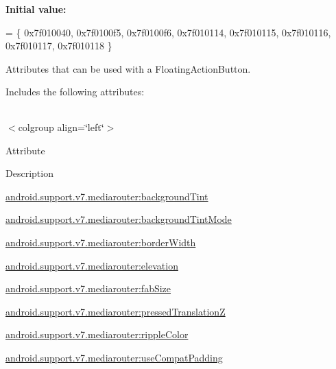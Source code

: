 {\bfseries Initial value\+:}
\begin{DoxyCode}
= \{
            0x7f010040, 0x7f0100f5, 0x7f0100f6, 0x7f010114,
            0x7f010115, 0x7f010116, 0x7f010117, 0x7f010118
        \}
\end{DoxyCode}
Attributes that can be used with a Floating\+Action\+Button. 

Includes the following attributes\+:

\tabulinesep=1mm
\begin{longtabu} spread 0pt [c]{*{0}{|X[-1]}|}
\hline
\end{longtabu}
$<$colgroup align=\char`\"{}left\char`\"{}$>$ 

Attribute

Description 

{\ttfamily \hyperlink{classandroid_1_1support_1_1v7_1_1mediarouter_1_1R_1_1styleable_aba6d8d43d6ae9315b2a7d8d808c39bdb}{android.\+support.\+v7.\+mediarouter\+:background\+Tint}}

{\ttfamily \hyperlink{classandroid_1_1support_1_1v7_1_1mediarouter_1_1R_1_1styleable_a6dab3663758d5db831d0a3c6d4c3cfd0}{android.\+support.\+v7.\+mediarouter\+:background\+Tint\+Mode}}

{\ttfamily \hyperlink{classandroid_1_1support_1_1v7_1_1mediarouter_1_1R_1_1styleable_a3062421234c87b23595c467fe125d6f8}{android.\+support.\+v7.\+mediarouter\+:border\+Width}}

{\ttfamily \hyperlink{classandroid_1_1support_1_1v7_1_1mediarouter_1_1R_1_1styleable_a825fd6ef93b166b8df535e4b2bef49ba}{android.\+support.\+v7.\+mediarouter\+:elevation}}

{\ttfamily \hyperlink{classandroid_1_1support_1_1v7_1_1mediarouter_1_1R_1_1styleable_abfd62dce09171db92b5473f46d12f11c}{android.\+support.\+v7.\+mediarouter\+:fab\+Size}}

{\ttfamily \hyperlink{classandroid_1_1support_1_1v7_1_1mediarouter_1_1R_1_1styleable_aa52a7c21087dc6e360ad24e8b65e15ef}{android.\+support.\+v7.\+mediarouter\+:pressed\+TranslationZ}}

{\ttfamily \hyperlink{classandroid_1_1support_1_1v7_1_1mediarouter_1_1R_1_1styleable_aa1f3b200711d78334f340170979ae709}{android.\+support.\+v7.\+mediarouter\+:ripple\+Color}}

{\ttfamily \hyperlink{classandroid_1_1support_1_1v7_1_1mediarouter_1_1R_1_1styleable_ad73fa0b4b35d2b72943f9fd2e4122f9a}{android.\+support.\+v7.\+mediarouter\+:use\+Compat\+Padding}}

